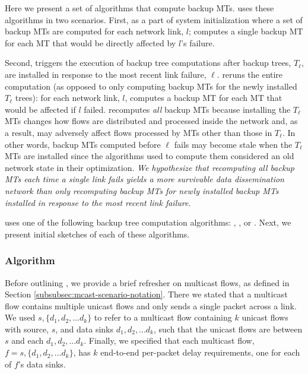 Here we present a set of algorithms that compute backup MTs.  \mdr uses these algorithms in two scenarios. First, as a part of system initialization 
where a set of backup MTs are computed for each network link, $l$; \mdr computes a single backup MT for each MT that would be directly affected by $l$'s failure. 

Second, \mdr triggers the execution of backup tree computations after backup trees, $T_{\ell}$, are installed in response to the most recent link failure, $\ell$. 
\mdr reruns the entire computation (as opposed to only computing backup MTs for the newly installed $T_{\ell}$ trees): 
for each network link, $l$, \mdr computes a backup MT for each MT that would be affected if $l$ failed.  
\mdr recomputes \emph{all} backup MTs because installing the $T_{\ell}$ MTs changes how flows are distributed and processed inside the network and, as a result, may
adversely affect flows processed by MTs other than those in $T_{\ell}$.
In other words, backup MTs computed before $\ell$ fails may become stale when the $T_{\ell}$ MTs are installed since the algorithms used to compute them considered an old network state in their optimization.
\emph{We hypothesize that recomputing \emph{all} backup MTs each time a single link fails yields a more survivable data dissemination network than only recomputing
backup MTs for newly installed backup MTs installed in response to the most recent link failure. }%

\mdr uses one of the following backup tree computation algorithms: \mfs, \mds, or \mcs. Next, we present initial sketches of each of these algorithms. 

\subsubsection{\mf Algorithm}
\label{subsubsec:mf-alg}

Before outlining \mfs, we provide a brief refresher on multicast flows, as defined in Section \ref{subsubsec:mcast-scenario-notation}.
There we stated that a multicast flow contains multiple unicast flows and only sends a single packet across a link.  We used $s,\{d_1,d_2, ... d_k\}$ to refer to a multicast flow containing 
$k$ unicast flows with source, $s$, and data sinks $d_1, d_2, ... d_k$, such that the unicast flows are between $s$ and each $d_1, d_2, ... d_k$.  Finally, we specified that
each multicast flow, $f = s,\{d_1,d_2, ... d_k\}$, has $k$ end-to-end per-packet delay requirements, one for each of $f$'s data sinks.

